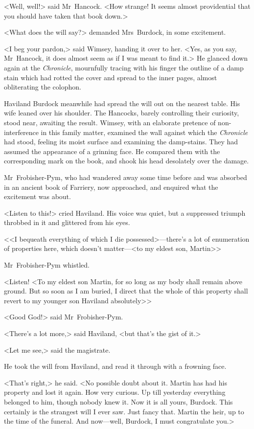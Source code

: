 <Well, well!> said Mr~Hancock. <How strange! It seems almost providential that you should have taken that book down.>

<What does the will say?> demanded Mrs~Burdock, in some excitement.

<I beg your pardon,> said Wimsey, handing it over to her. <Yes, as you say, Mr~Hancock, it does almost seem as if I was meant to find it.> He glanced down again at the \textit{Chronicle}, mournfully tracing with his finger the outline of a damp stain which had rotted the cover and spread to the inner pages, almost obliterating the colophon.

Haviland Burdock meanwhile had spread the will out on the nearest table. His wife leaned over his shoulder. The Hancocks, barely controlling their curiosity, stood near, awaiting the result. Wimsey, with an elaborate pretence of non-interference in this family matter, examined the wall against which the \textit{Chronicle} had stood, feeling its moist surface and examining the damp-stains. They had assumed the appearance of a grinning face. He compared them with the corresponding mark on the book, and shook his head desolately over the damage.

Mr~Frobisher-Pym, who had wandered away some time before and was absorbed in an ancient book of Farriery, now approached, and enquired what the excitement was about.

<Listen to this!> cried Haviland. His voice was quiet, but a suppressed triumph throbbed in it and glittered from his eyes.

<<I bequeath everything of which I die possessed>—there's a lot of enumeration of properties here, which doesn't matter—<to my eldest son, Martin>\longdash>

Mr~Frobisher-Pym whistled.

<Listen! <To my eldest son Martin, for so long as my body shall remain above ground. But so soon as I am buried, I direct that the whole of this property shall revert to my younger son Haviland absolutely>\longdash>

<Good God!> said Mr~Frobisher-Pym.

<There's a lot more,> said Haviland, <but that's the gist of it.>

<Let me see,> said the magistrate.

He took the will from Haviland, and read it through with a frowning face.

<That's right,> he said. <No possible doubt about it. Martin has had his property and lost it again. How very curious. Up till yesterday everything belonged to him, though nobody knew it. Now it is all yours, Burdock. This certainly is the strangest will I ever saw. Just fancy that. Martin the heir, up to the time of the funeral. And now—well, Burdock, I must congratulate you.>

